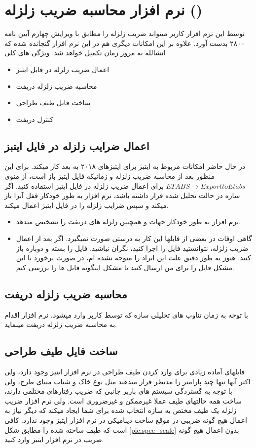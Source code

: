\section{نرم افزار محاسبه ضریب زلزله ()}
توسط این نرم افزار کاربر میتواند ضریب زلزله را مطابق با ویرایش چهارم آیین نامه ۲۸۰۰ بدست آورد. علاوه بر این امکانات دیگری هم در این نرم افزار گنجانده شده که انشالله به مرور زمان تکمیل خواهد شد. ویژگی های کلی

\begin{itemize}
    \item اعمال ضریب زلزله در فایل ایتبز
    \item محاسبه ضریب زلزله دریفت
    \item ساخت فایل طیف طراحی
    \item کنترل دریفت
\end{itemize}

\subsection{اعمال ضرایب زلزله در فایل ایتبز}
در حال حاضر امکانات مربوط به ایتبز برای ایتبزهای ۲۰۱۸ به بعد کار میکند. برای این منظور بعد از محاسبه ضریب زلزله و زمانیکه فایل ایتبز باز است، از منوی
$ETABS \rightarrow Export to Etabs$
برای اعمال ضریب زلزله در فایل ایتبز استفاده کنید. اگر سازه در حالت تحلیل شده قرار داشته باشد، نرم افزار به طور خودکار قفل آنرا باز میکند و سپس ضرایب زلزله را در فایل ایتبز اعمال میکند.

\begin{itemize}
    \item نرم افزار به طور خودکار جهات  و همچنین زلزله های دریفت را تشخیص میدهد.
    \item گاهی اوقات در بعضی از فایلها این کار به درستی صورت نمیگیرد. اگر بعد از اعمال ضریب زلزله، نتوانستید فایل را اجرا کنید، نگران نباشید. فایل را بسته و دوباره باز کنید. هنوز به طور دقیق علت این ایراد را متوجه نشده ام، در صورت برخورد با این مشکل فایل را برای من ارسال کنید تا مشکل اینگونه فایل ها را بررسی کنم.
\end{itemize}

\subsection{محاسبه ضریب زلزله دریفت}
با توجه به زمان تناوب های تحلیلی سازه که توسط کاربر وارد میشود، نرم افزار اقدام به محاسبه ضریب زلزله دریفت مینماید. 

\subsection{ساخت فایل طیف طراحی}
فایلهای آماده زیادی برای وارد کردن طیف طراحی در نرم افزار ایتبز وجود دارد، ولی اکثر آنها تنها چند پارامتر را مدنظر قرار میدهند مثل نوع خاک و شتاب مبنای طرح، ولی با توجه به گستردگی سیستم های باربر جانبی که ضریب رفتارهای مختلفی دارند،
ساخت همه حالتهای طیف عملا غیرممکن و غیرضروری است. ولی نرم افزار ضریب زلزله یک طیف مختص به سازه انتخاب شده برای شما ایجاد میکند که دیگر نیاز به اعمال هیچ گونه ضریبی در موقع ساخت
دینامیکی  در نرم افزار ایتبز وجود ندارد.
کافی است که طیف ساخته شده را مطابق شکل 
\ref{pic:spec_scale}
بدون اعمال هیچ گونه ضریب در نرم افزار ایتبز وارد کنید.


